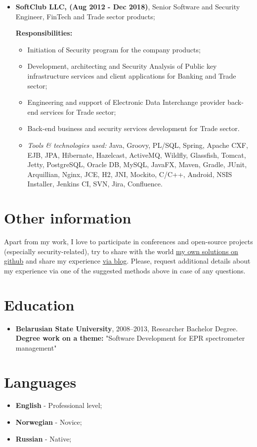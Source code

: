 \documentclass[a4paper, 12pt]{article}
\newcommand{\position}[1]{
    \textbf{#1}}
\newcommand{\itemlabel}[1]{
    \textit{#1:}}
\begin{document}
    \begin{itemize}
        \item \position{SoftClub LLC, (Aug 2012 - Dec 2018)}, Senior Software and Security Engineer, FinTech and Trade sector products;

            \textbf{Responsibilities:}
			\begin{itemize}
				\item Initiation of Security program for the company products;
  				\item Development, architecting and Security Analysis of Public key infrastructure services and client applications for Banking and Trade sector;
  				\item Engineering and support of Electronic Data Interchange provider back-end services for Trade sector;
				\item Back-end business and security services development for Trade sector.
			\end{itemize}
	
            \begin{itemize}
                \item \itemlabel{Tools \& technologies used} Java, Groovy, PL/SQL, Spring, Apache CXF, EJB, JPA, Hibernate, Hazelcast, ActiveMQ, Wildfly, Glassfish, Tomcat, Jetty, PostgreSQL, Oracle DB, MySQL, JavaFX, Maven, Gradle, JUnit, Arquillian, Nginx, JCE, H2, JNI, Mockito, C/C++, Android, NSIS Installer, Jenkins CI, SVN, Jira, Confluence.
            \end{itemize}
    \end{itemize}

\section*{Other information}  
Apart from my work, I love to participate in conferences and open-source projects (especially security-related), try to share with the world \href{https://github.com/EasyAppSecurity}{my own solutions on github} and share my experience \href{https://mikhailrusakovich.wordpress.com/}{via blog}. Please, request additional details about my experience via one of the suggested methods above in case of any questions.

\section*{Education}

    \begin{itemize}

        \item \position{Belarusian State University}, 2008--2013, Researcher Bachelor Degree.
            \newline\textbf{Degree work on a theme:} 
            \newline "Software Development for EPR spectrometer management"
    \end{itemize}
    
\section*{Languages}
 	\begin{itemize}
 		 \item \position{English} - Professional level;
 		 \item \position{Norwegian} - Novice;
 		 \item \position{Russian} - Native;

 	\end{itemize}    
    
\end{document}
